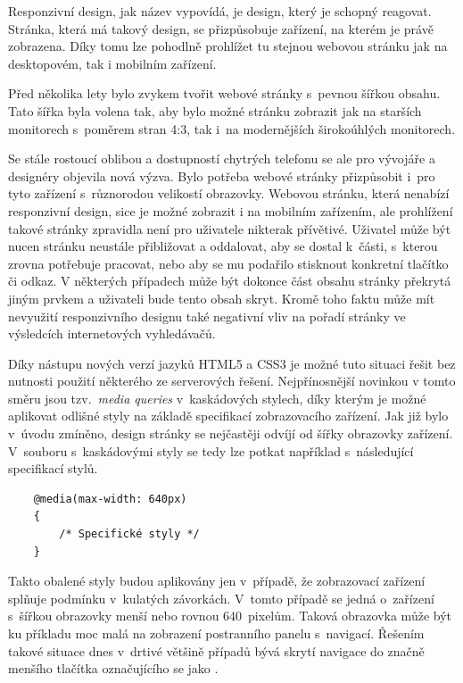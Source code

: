 Responzivní design, jak název vypovídá, je design, který je schopný reagovat. Stránka, která má takový design, se přizpůsobuje zařízení, na kterém je právě zobrazena. Díky tomu lze pohodlně prohlížet tu stejnou webovou stránku jak na desktopovém, tak i mobilním zařízení. 

Před několika lety bylo zvykem tvořit webové stránky s~pevnou šířkou obsahu. Tato šířka byla volena tak, aby bylo možné stránku zobrazit jak na starších monitorech s~poměrem stran 4:3, tak i~na modernějších širokoúhlých monitorech. 

Se stále rostoucí oblibou a dostupností chytrých telefonu se ale pro vývojáře a designéry objevila nová výzva. Bylo potřeba webové stránky přizpůsobit i~pro tyto zařízení s~různorodou velikostí obrazovky. Webovou stránku, která nenabízí responzivní design, sice je možné zobrazit i na mobilním zařízením, ale prohlížení takové stránky zpravidla není pro uživatele nikterak přívětivé. Uživatel může být nucen stránku neustále přibližovat a oddalovat, aby se dostal k~části, s~kterou zrovna potřebuje pracovat, nebo aby se mu podařilo stisknout konkretní tlačítko či odkaz. V některých případech může být dokonce část obsahu stránky překrytá jiným prvkem a uživateli bude tento obsah skryt. Kromě toho faktu může mít nevyužití responzivního designu také negativní vliv na pořadí stránky ve výsledcích internetových vyhledávačů.

Díky nástupu nových verzí jazyků HTML5 a CSS3 je možné tuto situaci řešit bez nutnosti použití některého ze serverových řešení. Nejpřínosnější novinkou v tomto směru jsou tzv.~\emph{media queries} v~kaskádových stylech, díky kterým je možné aplikovat odlišné styly na základě specifikací zobrazovacího zařízení. Jak již bylo v~úvodu zmíněno, design stránky se nejčastěji odvíjí od šířky obrazovky zařízení. V~souboru s~kaskádovými styly se tedy lze potkat například s~následující specifikací stylů.

\begin{verbatim}
    @media(max-width: 640px)
    {
        /* Specifické styly */
    }
\end{verbatim}

Takto obalené styly budou aplikovány jen v~případě, že zobrazovací zařízení splňuje podmínku v~kulatých závorkách. V~tomto případě se jedná o~zařízení s~šířkou obrazovky menší nebo rovnou 640~pixelům. Taková obrazovka může být ku příkladu moc malá na zobrazení postranního panelu s~navigací. Řešením takové situace dnes v~drtivé většině případů bývá skrytí navigace do značně menšího tlačítka označujícího se jako .

